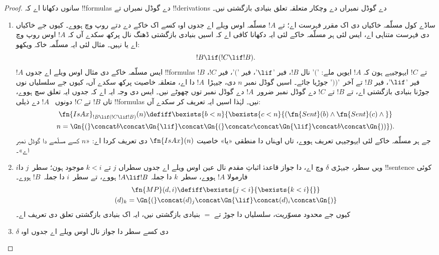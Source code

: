 \documentclass[../../../include/open-logic-section]{subfiles}
\begin{document}
\begin{proof}
سانوں دکھانا اے کہ !!{formula}s دے
گوڈل نمبراں تے !!{derivation}s دے
گوڈل نمبراں دے وچکار متعلقہ
تعلق بنیادی بازگشتی نیں۔
\begin{enumerate}
\item ساڈے کول مسلّمہ خاکیاں دی
  اک مقرر فہرست اے؛ تے $!A$
  مسلّمہ اوس ویلے اے جدوں اوہ
  کسے اک خاکے دے دتے روپ وچ
  ہووے۔ کیوں جے خاکیاں دی فہرست متناہی اے، ایس لئی
  ہر مسلّمہ خاکے لئی ایہ
  دکھانا کافی اے کہ اسیں
  بنیادی بازگشتی ڈھنگ نال
  پرکھ سکدے آں کہ $!A$
  اوس روپ وچ اے یا نہیں۔
  مثال لئی ایہ مسلّمہ
  خاکہ ویکھو:
  \[
  !B \lif (!C \lif !B).
  \]
  $!A$ ایس مسلّمہ خاکے دی
  مثال اوس ویلے اے جدوں
  !!{formula}s $!B$ تے $!C$
  ایہوجیہے ہون کہ $!A$
  ایویں ملے: '$($' نال
  $!B$، فیر '$\lif$'،
  فیر '$($'، فیر $!C$،
  فیر '$\lif$'، فیر $!B$
  تے آخر~'$))$' جوڑیا
  جائے۔ اسیں گوڈل نمبر $n$ دی،
  جیہڑا~$!A$ دا اے،
  متعلقہ خاصیت پرکھ سکدے
  آں، کیوں جے سلسلیاں
  نوں جوڑنا بنیادی
  بازگشتی اے، تے $!B$
  تے $!C$ دے گوڈل نمبر
  ضرور~$!A$ دے گوڈل
  نمبر توں چھوٹے نیں۔
  ایس دی وجہ ایہ اے کہ
  جدوں ایہ تعلق سچ
  ہووے، تاں $!B$
  تے $!C$ دونوں
  ~$!A$ دے ذیلی
  !!{formula}s نیں۔
  لہٰذا اسیں ایہ
  تعریف کر سکدے آں:
  \begin{multline*}
  \fn{IsAx}_{!B \lif (!C \lif !B)}(n) \defiff \bexists{b< n}{
    \bexists{c < n}{(\fn{Sent}(b) \land \fn{Sent}(c) \land {}}}\\ n =
  \Gn{(} \concat b \concat \Gn{\lif} \concat \Gn{(} \concat c \concat
  \Gn{\lif} \concat b \concat \Gn{))}).
  \end{multline*}
  جے ہر مسلّمہ خاکے
  لئی ایہوجیہی تعریف
  ہووے، تاں اوہناں دا منطقی «یا»
  خاصیت $\fn{IsAx}(n)$
  دی تعریف کردا اے:
  «$n$ کسے مسلّمے
  دا گوڈل نمبر اے»۔
\item $i$ویں سطر، جیہڑی $\delta$ وچ اے،
  دا جواز قاعدۂ
  اثباتِ مقدم نال
  عین اوس ویلے اے
  جدوں سطراں $j$
  تے $k < i$
  موجود ہون؛ سطر~$j$
  دا !!{sentence}
  کوئی فارمولا $!A$
  ہووے، سطر~$k$
  دا جملہ
  $!A \lif !B$
  ہووے، تے
  سطر~$i$ دا
  جملہ~$!B$
  ہووے۔
  \begin{multline*}
    \fn{MP}(d, i) \defiff \bexists{j < i}{\bexists{k < i}{}}\\
    (d)_k = \Gn{(} \concat (d)_j
      \concat \Gn{\lif} \concat (d)_i \concat \Gn{)}
  \end{multline*}
  کیوں جے محدود
  مسوّریت، سلسلیاں
  دا جوڑ تے $=$
  بنیادی بازگشتی
  نیں، ایہ اک
  بنیادی بازگشتی
  تعلق دی تعریف اے۔
\item $\delta$ دی کسے
  سطر دا جواز \QR{}
  نال اوس ویلے اے
  جدوں اوہ

\end{enumerate}
\end{proof}
\end{document}
